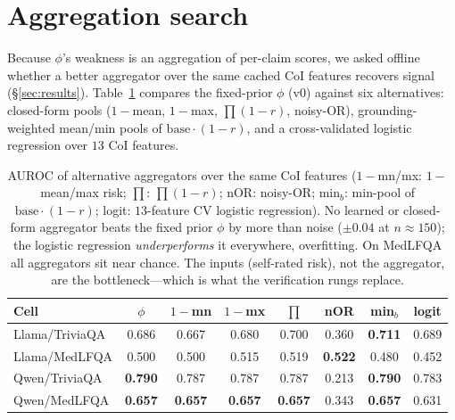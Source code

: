 \documentclass[11pt]{article}
\begin{document}
\section{Aggregation search}\label{app:agg}
Because $\phi$'s weakness is an aggregation of per-claim scores, we asked offline whether a
better aggregator over the same cached CoI features recovers signal (\S\ref{sec:results}).
Table~\ref{tab:agg} compares the fixed-prior $\phi$ (v0) against six alternatives: closed-form
pools ($1{-}$mean, $1{-}$max, $\prod(1{-}r)$, noisy-OR), grounding-weighted mean/min pools of
$\mathrm{base}\cdot(1{-}r)$, and a cross-validated logistic regression over $13$ CoI features.
\begin{table}[h]
\centering\small
\setlength{\tabcolsep}{3.5pt}
\begin{tabular}{lccccccc}
\toprule
Cell & $\phi$ & $1{-}$mn & $1{-}$mx & $\prod$ & nOR & min$_b$ & logit \\
\midrule
Llama/TriviaQA & 0.686 & 0.667 & 0.680 & 0.700 & 0.360 & \textbf{0.711} & 0.689 \\
Llama/MedLFQA  & 0.500 & 0.500 & 0.515 & 0.519 & \textbf{0.522} & 0.480 & 0.452 \\
Qwen/TriviaQA  & \textbf{0.790} & 0.787 & 0.787 & 0.787 & 0.213 & \textbf{0.790} & 0.783 \\
Qwen/MedLFQA   & \textbf{0.657} & \textbf{0.657} & \textbf{0.657} & \textbf{0.657} & 0.343 & \textbf{0.657} & 0.631 \\
\bottomrule
\end{tabular}
\caption{AUROC of alternative aggregators over the same CoI features ($1{-}$mn/mx: $1{-}$mean/max
risk; $\prod$: $\prod(1{-}r)$; nOR: noisy-OR; min$_b$: min-pool of $\mathrm{base}\cdot(1{-}r)$;
logit: $13$-feature CV logistic regression). No learned or closed-form aggregator beats the
fixed prior $\phi$ by more than noise ($\pm0.04$ at $n{\approx}150$); the logistic regression
\emph{underperforms} it everywhere, overfitting. On MedLFQA all aggregators sit near chance. The
inputs (self-rated risk), not the aggregator, are the bottleneck---which is what the
verification rungs replace.}
\label{tab:agg}
\end{table}
\end{document}
